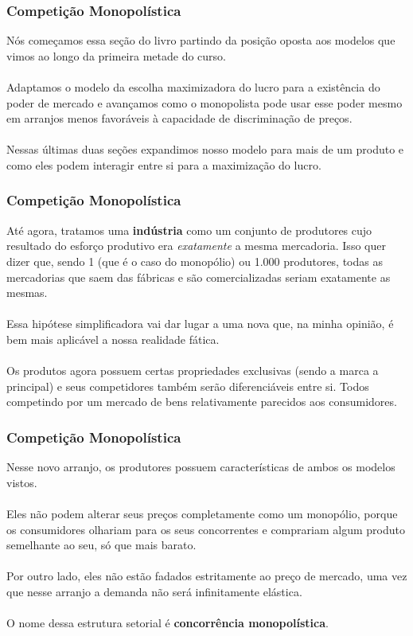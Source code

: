 \documentclass{beamer}[10]
\begin{document}
\begin{frame}
	\frametitle{Competição Monopolística}

	Nós começamos essa seção do livro partindo da posição oposta aos modelos que vimos ao longo da primeira metade do curso.
	\\~\\
	Adaptamos o modelo da escolha maximizadora do lucro para a existência do poder de mercado e avançamos como o monopolista pode usar esse poder mesmo em arranjos menos favoráveis à capacidade de discriminação de preços.
	\\~\\
	Nessas últimas duas seções expandimos nosso modelo para mais de um produto e como eles podem interagir entre si para a maximização do lucro.

\end{frame}

\begin{frame}
	\frametitle{Competição Monopolística}

	Até agora, tratamos uma \textbf{indústria} como um conjunto de produtores cujo resultado do esforço produtivo era \textit{exatamente} a mesma mercadoria. Isso quer dizer que, sendo 1 (que é o caso do monopólio) ou 1.000 produtores, todas as mercadorias que saem das fábricas e são comercializadas seriam exatamente as mesmas. 
	\\~\\
	Essa hipótese simplificadora vai dar lugar a uma nova que, na minha opinião, é bem mais aplicável a nossa realidade fática.
	\\~\\
	Os produtos agora possuem certas propriedades exclusivas (sendo a marca a principal) e seus competidores também serão diferenciáveis entre si. Todos competindo por um mercado de bens relativamente parecidos aos consumidores.

\end{frame}

\begin{frame}
	\frametitle{Competição Monopolística}

	Nesse novo arranjo, os produtores possuem características de ambos os modelos vistos. 
	\\~\\
	Eles não podem alterar seus preços completamente como um monopólio, porque os consumidores olhariam para os seus concorrentes e comprariam algum produto semelhante ao seu, só que mais barato. 
	\\~\\
	Por outro lado, eles não estão fadados estritamente ao preço de mercado, uma vez que nesse arranjo a demanda não será infinitamente elástica. 
	\\~\\
	O nome dessa estrutura setorial é \textbf{concorrência monopolística}.

\end{frame}
\end{document}
